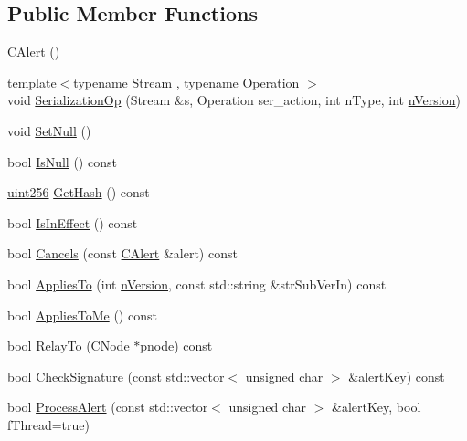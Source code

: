 \subsection*{Public Member Functions}
\begin{DoxyCompactItemize}
\item 
\mbox{\hyperlink{class_c_alert_a116117e2318b9468a5ca80472c0b5157}{C\+Alert}} ()
\item 
{\footnotesize template$<$typename Stream , typename Operation $>$ }\\void \mbox{\hyperlink{class_c_alert_a51d73ab316bb42e65b87ec14ac536b14}{Serialization\+Op}} (Stream \&s, Operation ser\+\_\+action, int n\+Type, int \mbox{\hyperlink{class_c_unsigned_alert_ad8fad8e8f62caaf8162fad19170de2cf}{n\+Version}})
\item 
void \mbox{\hyperlink{class_c_alert_a93fd881c55ab448213787f49e316eb99}{Set\+Null}} ()
\item 
bool \mbox{\hyperlink{class_c_alert_a9c728b7fe91e74c51116a23b07d6978a}{Is\+Null}} () const
\item 
\mbox{\hyperlink{classuint256}{uint256}} \mbox{\hyperlink{class_c_alert_a059c136c9556e5e59a1a4dc39a97366d}{Get\+Hash}} () const
\item 
bool \mbox{\hyperlink{class_c_alert_a018da40779a5c095c38bf10f4256cee6}{Is\+In\+Effect}} () const
\item 
bool \mbox{\hyperlink{class_c_alert_a75777afd3418c6cd74f7e9e4caed3472}{Cancels}} (const \mbox{\hyperlink{class_c_alert}{C\+Alert}} \&alert) const
\item 
bool \mbox{\hyperlink{class_c_alert_a9e6ab19be3dc74242c2f535c3803ca96}{Applies\+To}} (int \mbox{\hyperlink{class_c_unsigned_alert_ad8fad8e8f62caaf8162fad19170de2cf}{n\+Version}}, const std\+::string \&str\+Sub\+Ver\+In) const
\item 
bool \mbox{\hyperlink{class_c_alert_aba79cc9e957446fe93f05cb18f12b24b}{Applies\+To\+Me}} () const
\item 
bool \mbox{\hyperlink{class_c_alert_a21a801f1a5978889722771d4eb13bf37}{Relay\+To}} (\mbox{\hyperlink{class_c_node}{C\+Node}} $\ast$pnode) const
\item 
bool \mbox{\hyperlink{class_c_alert_a07fea34252a3ef5b291237641caa7203}{Check\+Signature}} (const std\+::vector$<$ unsigned char $>$ \&alert\+Key) const
\item 
bool \mbox{\hyperlink{class_c_alert_af63a26aab450c2bc4781717e30ede67b}{Process\+Alert}} (const std\+::vector$<$ unsigned char $>$ \&alert\+Key, bool f\+Thread=true)
\end{DoxyCompactItemize}
